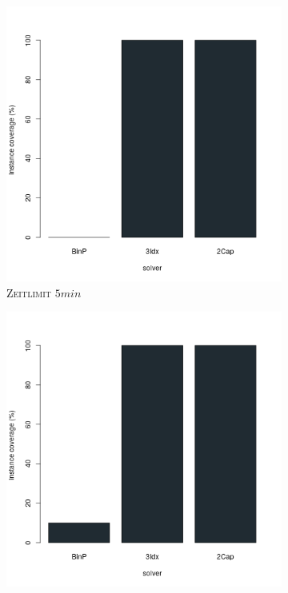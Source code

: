 \begin{figure}[H]
\centering

\begin{subfigure}[b]{0.3\textwidth}
\centering
\includegraphics[width=1.1\textwidth]{img/solver_instance_coverage_b=2_l_300s.png}
\caption{\textsc{Zeitlimit} $5min$}
\label{fig:instance_cov_b=2_l_a}
\end{subfigure}
\hfill
\begin{subfigure}[b]{0.3\textwidth}
\centering
\includegraphics[width=1.1\textwidth]{img/solver_instance_coverage_b=2_l_600s.png}

\end{subfigure}
\end{figure}
